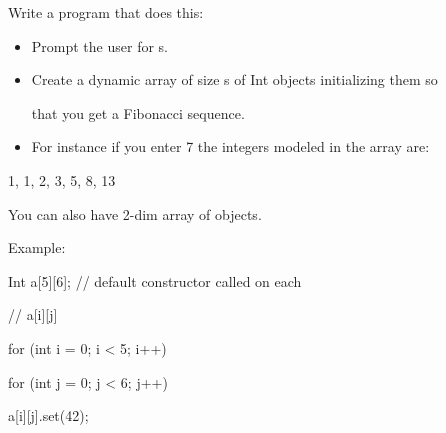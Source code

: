 Write a program that does this:



\begin{itemize}

\item

  Prompt the user for s.

\item

  Create a dynamic array of size s of Int objects initializing them so

  that you get a Fibonacci sequence.

\item

  For instance if you enter 7 the integers modeled in the array are:

\end{itemize}

\begin{center}

1, 1, 2, 3, 5, 8, 13

\end{center}

You can also have 2-dim array of objects.



Example:

\begin{console}

Int a[5][6]; // default constructor called on each

             // a[i][j]

for (int i = 0; i < 5; i++)

    for (int j = 0; j < 6; j++)

        a[i][j].set(42);

\end{console}

